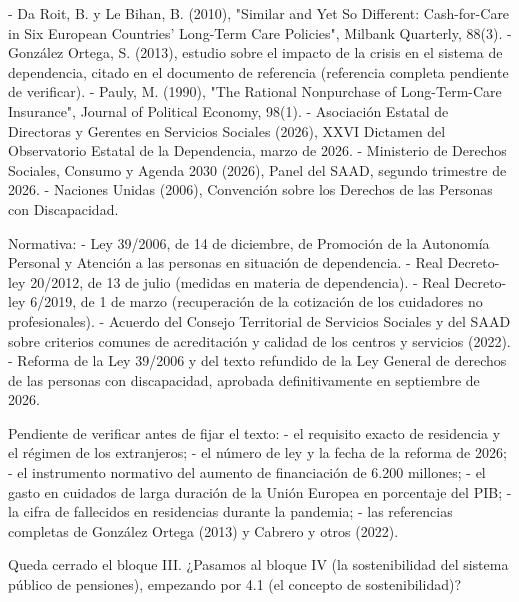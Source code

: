 \documentclass[10pt,a4paper]{article}
\begin{document}
- Da Roit, B. y Le Bihan, B. (2010), "Similar and Yet So Different: Cash-for-Care in Six European Countries' Long-Term Care Policies", Milbank Quarterly, 88(3).
- González Ortega, S. (2013), estudio sobre el impacto de la crisis en el sistema de dependencia, citado en el documento de referencia (referencia completa pendiente de verificar).
- Pauly, M. (1990), "The Rational Nonpurchase of Long-Term-Care Insurance", Journal of Political Economy, 98(1).
- Asociación Estatal de Directoras y Gerentes en Servicios Sociales (2026), XXVI Dictamen del Observatorio Estatal de la Dependencia, marzo de 2026.
- Ministerio de Derechos Sociales, Consumo y Agenda 2030 (2026), Panel del SAAD, segundo trimestre de 2026.
- Naciones Unidas (2006), Convención sobre los Derechos de las Personas con Discapacidad.

Normativa:
- Ley 39/2006, de 14 de diciembre, de Promoción de la Autonomía Personal y Atención a las personas en situación de dependencia.
- Real Decreto-ley 20/2012, de 13 de julio (medidas en materia de dependencia).
- Real Decreto-ley 6/2019, de 1 de marzo (recuperación de la cotización de los cuidadores no profesionales).
- Acuerdo del Consejo Territorial de Servicios Sociales y del SAAD sobre criterios comunes de acreditación y calidad de los centros y servicios (2022).
- Reforma de la Ley 39/2006 y del texto refundido de la Ley General de derechos de las personas con discapacidad, aprobada definitivamente en septiembre de 2026.

Pendiente de verificar antes de fijar el texto:
- el requisito exacto de residencia y el régimen de los extranjeros;
- el número de ley y la fecha de la reforma de 2026;
- el instrumento normativo del aumento de financiación de 6.200 millones;
- el gasto en cuidados de larga duración de la Unión Europea en porcentaje del PIB;
- la cifra de fallecidos en residencias durante la pandemia;
- las referencias completas de González Ortega (2013) y Cabrero y otros (2022).

Queda cerrado el bloque III. ¿Pasamos al bloque IV (la sostenibilidad del sistema público de pensiones), empezando por 4.1 (el concepto de sostenibilidad)?
\end{document}
